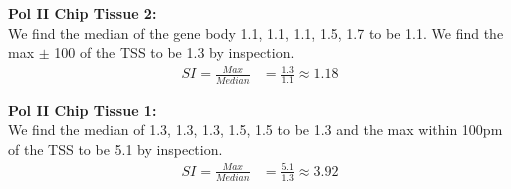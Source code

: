 \documentclass[10pt]{article} %
\begin{document}
\textbf{Pol II Chip Tissue 2:}\\
We find the median of the gene body {1.1, 1.1, 1.1, 1.5, 1.7} to be 1.1.
We find the max $\pm$ 100 of the TSS to be 1.3 by inspection.\\
\begin{align*}
  SI = \frac{Max}{Median} &= \frac{1.3}{1.1} \approx 1.18
\end{align*}

\textbf{Pol II Chip Tissue 1:}\\
We find the median of {1.3, 1.3, 1.3, 1.5, 1.5} to be 1.3 and the max within 100pm of
the TSS to be 5.1 by inspection.\\
\begin{align*}
  SI = \frac{Max}{Median} &= \frac{5.1}{1.3} \approx 3.92
\end{align*}
\end{document}
